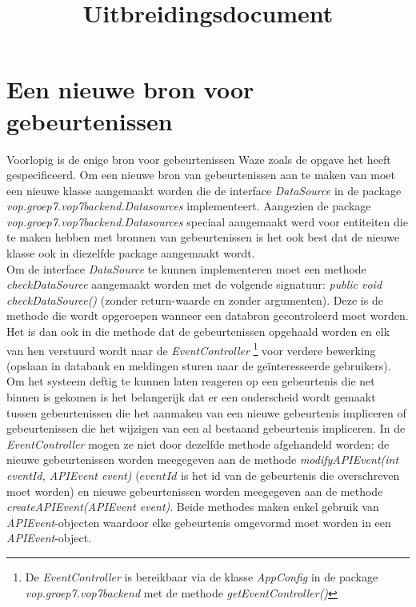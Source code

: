 \documentclass{article}
\title{Uitbreidingsdocument}
\newcommand*{\javaclass}[1]{\emph{#1}}
\newcommand*{\javaintfc}[1]{\javaclass{#1}}
\newcommand*{\javapckg}[1]{\javaclass{#1}}
\newcommand*{\javamethodpres}[1]{\javaclass{#1}}
\newcommand*{\javamethod}[2]{\javaclass{#1(#2)}}
\begin{document}

\newpage
\tableofcontents
\newpage

\section{Een nieuwe bron voor gebeurtenissen}
Voorlopig is de enige bron voor gebeurtenissen Waze zoals de opgave het heeft gespecificeerd. Om een nieuwe bron van gebeurtenissen aan te maken van moet een nieuwe klasse aangemaakt worden die de interface \javaintfc{DataSource} in de package \javapckg{vop.groep7.vop7backend.Datasources} implementeert. Aangezien de package \javapckg{vop.groep7.vop7backend.Datasources} speciaal aangemaakt werd voor entiteiten die te maken hebben met bronnen van gebeurtenissen is het ook best dat de nieuwe klasse ook in diezelfde package aangemaakt wordt.\\
Om de interface \javaintfc{DataSource} te kunnen implementeren moet een methode \javamethodpres{checkDataSource} aangemaakt worden met de volgende signatuur: \javamethod{public void checkDataSource}{} (zonder return-waarde en zonder argumenten). Deze is de methode die wordt opgeroepen wanneer een databron gecontroleerd moet worden. Het is dan ook in die methode dat de gebeurtenissen opgehaald worden en elk van hen verstuurd wordt naar de \javaclass{EventController} \footnote{De \javaclass{EventController} is bereikbaar via de klasse \javaclass{AppConfig} in de package \javapckg{vop.groep7.vop7backend} met de methode \javamethod{getEventController}{}} voor verdere bewerking (opslaan in databank en meldingen sturen naar de geïnteresseerde gebruikers).\\
Om het systeem deftig te kunnen laten reageren op een gebeurtenis die net binnen is gekomen is het belangerijk dat er een onderscheid wordt gemaakt tussen gebeurtenissen die het aanmaken van een nieuwe gebeurtenis impliceren of gebeurtenissen die het wijzigen van een al bestaand gebeurtenis impliceren. In de \javaclass{EventController} mogen ze niet door dezelfde methode afgehandeld worden: de nieuwe gebeurtenissen worden meegegeven aan de methode \javamethod{modifyAPIEvent}{int eventId, APIEvent event} ($eventId$ is het id van de gebeurtenis die overschreven moet worden) en nieuwe gebeurtenissen worden meegegeven aan de methode \javamethod{createAPIEvent}{APIEvent event}. Beide methodes maken enkel gebruik van \javaclass{APIEvent}-objecten waardoor elke gebeurtenis omgevormd moet worden in een \javaclass{APIEvent}-object.\\
\end{document}
